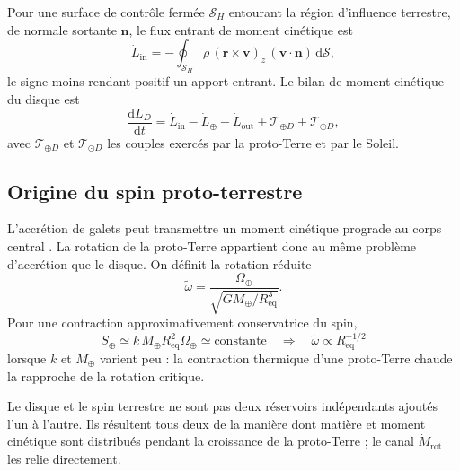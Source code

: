 \documentclass[11pt,a4paper,openany]{report}
\newcommand{\Mt}{M_{\oplus}}
\newcommand{\Req}{R_{\mathrm{eq}}}
\newcommand{\dd}{\mathrm{d}}
\begin{document}
Pour une surface de contrôle fermée $\mathcal{S}_H$ entourant la région d'influence terrestre, de
normale sortante $\mathbf{n}$, le flux entrant de moment cinétique est
\begin{equation}
\dot L_{\mathrm{in}}=-\oint_{\mathcal{S}_H}\rho\,(\mathbf{r}\times\mathbf{v})_z\,
(\mathbf{v}\cdot\mathbf{n})\,\dd\mathcal{S},
\label{eq:Lin}
\end{equation}
le signe moins rendant positif un apport entrant. Le bilan de moment cinétique du disque est
\begin{equation}
\frac{\dd L_D}{\dd t}=\dot L_{\mathrm{in}}-\dot L_{\oplus}-\dot L_{\mathrm{out}}
+\mathcal{T}_{\oplus D}+\mathcal{T}_{\odot D},
\label{eq:bilanL}
\end{equation}
avec $\mathcal{T}_{\oplus D}$ et $\mathcal{T}_{\odot D}$ les couples exercés par la proto-Terre et par
le Soleil.

\subsection{Origine du spin proto-terrestre}

L'accrétion de galets peut transmettre un moment cinétique prograde au corps central
\cite{JohansenLacerda2010,Visser2020}. La rotation de la proto-Terre appartient donc au même
problème d'accrétion que le disque. On définit la rotation réduite
\begin{equation}
\tilde\omega=\frac{\Omega_\oplus}{\sqrt{G\Mt/\Req^3}}.
\label{eq:omegatilde}
\end{equation}
Pour une contraction approximativement conservatrice du spin,
\begin{equation}
S_\oplus\simeq k\,\Mt\Req^2\Omega_\oplus\simeq\text{constante}
\quad\Longrightarrow\quad
\tilde\omega\propto\Req^{-1/2}
\label{eq:spin}
\end{equation}
lorsque $k$ et $\Mt$ varient peu : la contraction thermique d'une proto-Terre chaude la
rapproche de la rotation critique.

\begin{ideephys}
Le disque et le spin terrestre ne sont pas deux réservoirs indépendants ajoutés l'un à l'autre. Ils
résultent tous deux de la manière dont matière et moment cinétique sont distribués pendant la
croissance de la proto-Terre ; le canal $\dot M_{\mathrm{rot}}$ les relie directement.
\end{ideephys}

\end{document}
